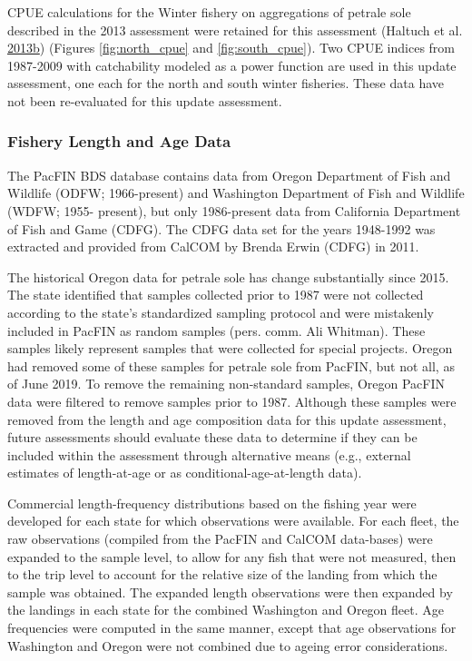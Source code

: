 \documentclass[12pt,]{article}
\begin{document}
CPUE calculations for the Winter fishery on aggregations of petrale sole
described in the 2013 assessment were retained for this assessment
(Haltuch et al.
\protect\hyperlink{ref-haltuch_status_2013}{2013}\protect\hyperlink{ref-haltuch_status_2013}{b})
(Figures \ref{fig:north_cpue} and \ref{fig:south_cpue}). Two CPUE
indices from 1987-2009 with catchability modeled as a power function are
used in this update assessment, one each for the north and south winter
fisheries. These data have not been re-evaluated for this update
assessment.

\subsubsection{Fishery Length and Age
Data}\label{fishery-length-and-age-data}

The PacFIN BDS database contains data from Oregon Department of Fish and
Wildlife (ODFW; 1966-present) and Washington Department of Fish and
Wildlife (WDFW; 1955- present), but only 1986-present data from
California Department of Fish and Game (CDFG). The CDFG data set for the
years 1948-1992 was extracted and provided from CalCOM by Brenda Erwin
(CDFG) in 2011.

The historical Oregon data for petrale sole has change substantially
since 2015. The state identified that samples collected prior to 1987
were not collected according to the state's standardized sampling
protocol and were mistakenly included in PacFIN as random samples (pers.
comm. Ali Whitman). These samples likely represent samples that were
collected for special projects. Oregon had removed some of these samples
for petrale sole from PacFIN, but not all, as of June 2019. To remove
the remaining non-standard samples, Oregon PacFIN data were filtered to
remove samples prior to 1987. Although these samples were removed from
the length and age composition data for this update assessment, future
assessments should evaluate these data to determine if they can be
included within the assessment through alternative means (e.g., external
estimates of length-at-age or as conditional-age-at-length data).

Commercial length-frequency distributions based on the fishing year were
developed for each state for which observations were available. For each
fleet, the raw observations (compiled from the PacFIN and CalCOM
data-bases) were expanded to the sample level, to allow for any fish
that were not measured, then to the trip level to account for the
relative size of the landing from which the sample was obtained. The
expanded length observations were then expanded by the landings in each
state for the combined Washington and Oregon fleet. Age frequencies were
computed in the same manner, except that age observations for Washington
and Oregon were not combined due to ageing error considerations.
\end{document}
